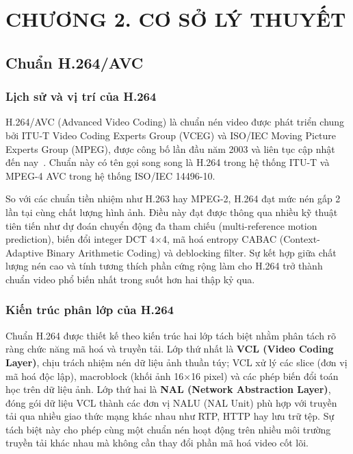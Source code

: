 \clearpage
{}
\section*{CHƯƠNG 2. CƠ SỞ LÝ THUYẾT}
\setcounter{section}{2}
\setcounter{subsection}{0}
\setcounter{figure}{0}
\setcounter{table}{0}
\setcounter{equation}{0}

\subsection{Chuẩn H.264/AVC}

\subsubsection{Lịch sử và vị trí của H.264}

H.264/AVC (Advanced Video Coding) là chuẩn nén video được phát triển chung bởi
ITU-T Video Coding Experts Group (VCEG) và ISO/IEC Moving Picture Experts Group (MPEG),
được công bố lần đầu năm 2003 và liên tục cập nhật đến nay~\cite{itu_h264}.
Chuẩn này có tên gọi song song là H.264 trong hệ thống ITU-T và MPEG-4 AVC
trong hệ thống ISO/IEC 14496-10.

So với các chuẩn tiền nhiệm như H.263 hay MPEG-2, H.264 đạt mức nén gấp 2 lần
tại cùng chất lượng hình ảnh. Điều này đạt được thông qua nhiều kỹ thuật tiên tiến
như dự đoán chuyển động đa tham chiếu (multi-reference motion prediction), biến đổi
integer DCT 4$\times$4, mã hoá entropy CABAC (Context-Adaptive Binary Arithmetic Coding)
và deblocking filter. Sự kết hợp giữa chất lượng nén cao và tính tương thích phần cứng
rộng làm cho H.264 trở thành chuẩn video phổ biến nhất trong suốt hơn hai thập kỷ qua.

\subsubsection{Kiến trúc phân lớp của H.264}

Chuẩn H.264 được thiết kế theo kiến trúc hai lớp tách biệt nhằm phân tách rõ ràng chức năng mã hoá và truyền tải. Lớp thứ nhất là \textbf{VCL (Video Coding Layer)}, chịu trách nhiệm nén dữ liệu ảnh thuần túy; VCL xử lý các slice (đơn vị mã hoá độc lập), macroblock (khối ảnh 16$\times$16 pixel) và các phép biến đổi toán học trên dữ liệu ảnh. Lớp thứ hai là \textbf{NAL (Network Abstraction Layer)}, đóng gói dữ liệu VCL thành các đơn vị NALU (NAL Unit) phù hợp với truyền tải qua nhiều giao thức mạng khác nhau như RTP, HTTP hay lưu trữ tệp. Sự tách biệt này cho phép cùng một chuẩn nén hoạt động trên nhiều môi trường truyền tải khác nhau mà không cần thay đổi phần mã hoá video cốt lõi.

